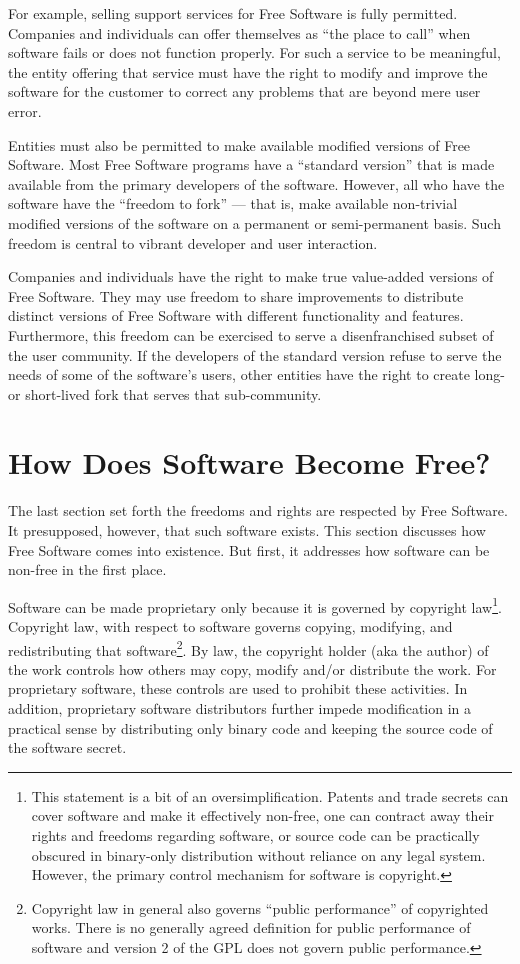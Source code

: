 \documentclass[12pt]{report}
\begin{document}
For example, selling support services for Free Software is fully
permitted.  Companies and individuals can offer themselves as ``the place
to call'' when software fails or does not function properly.  For such a
service to be meaningful, the entity offering that service must have the
right to modify and improve the software for the customer to correct any
problems that are beyond mere user error.

Entities must also be permitted to make available modified versions of
Free Software.  Most Free Software programs have a ``standard version''
that is made available from the primary developers of the software.
However, all who have the software have the ``freedom to fork'' --- that
is, make available non-trivial modified versions of the software on a
permanent or semi-permanent basis.  Such freedom is central to vibrant
developer and user interaction.

Companies and individuals have the right to make true value-added versions
of Free Software.  They may use freedom to share improvements to
distribute distinct versions of Free Software with different functionality
and features.  Furthermore, this freedom can be exercised to serve a
disenfranchised subset of the user community.  If the developers of the
standard version refuse to serve the needs of some of the software's
users, other entities have the right to create long- or short-lived fork
that serves that sub-community.

\section{How Does Software Become Free?}

The last section set forth the freedoms and rights are respected by Free
Software.  It presupposed, however, that such software exists.  This
section discusses how Free Software comes into existence.  But first, it
addresses how software can be non-free in the first place.

Software can be made proprietary only because it is governed by copyright
law\footnote{This statement is a bit of an oversimplification.  Patents
  and trade secrets can cover software and make it effectively non-free,
  one can contract away their rights and freedoms regarding software, or
  source code can be practically obscured in binary-only distribution
  without reliance on any legal system.  However, the primary control
  mechanism for software is copyright.}.  Copyright law, with respect to
software governs copying, modifying, and redistributing that
software\footnote{Copyright law in general also governs ``public
  performance'' of copyrighted works.  There is no generally agreed
  definition for public performance of software and version 2 of the GPL
  does not govern public performance.}.  By law, the copyright holder (aka
the author) of the work controls how others may copy, modify and/or
distribute the work.  For proprietary software, these controls are used to
prohibit these activities.  In addition, proprietary software distributors
further impede modification in a practical sense by distributing only
binary code and keeping the source code of the software secret.
\end{document}
